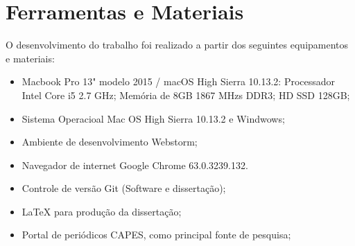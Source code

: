 \begin{figure}[!ht]
	\centering	
\end{figure}
\FloatBarrier

\section{Ferramentas e Materiais}
O desenvolvimento do trabalho foi realizado a partir dos seguintes equipamentos e materiais:
\begin{itemize}
	\item Macbook Pro 13" modelo 2015 / macOS High Sierra 10.13.2:
	\subitem Processador Intel Core i5 2.7 GHz;
	\subitem Memória de 8GB 1867 MHzs DDR3;
	\subitem HD SSD 128GB;
	\item Sistema Operacioal Mac OS High Sierra 10.13.2 e Windwows;
	\item Ambiente de desenvolvimento Webstorm;
	\item Navegador de internet Google Chrome 63.0.3239.132.
	\item Controle de versão Git (Software e dissertação);
	\item \LaTeX ${ }$ para produção da dissertação;
	\item Portal de periódicos CAPES, como principal fonte de pesquisa;
\end{itemize}